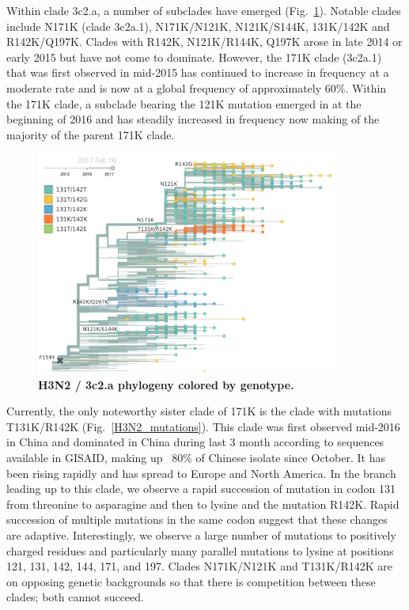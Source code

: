 \documentclass[11pt,oneside,letterpaper]{article}
\begin{document}
\pagebreak

Within clade 3c2.a, a number of subclades have emerged (Fig.\ \ref{H3N2_tree}).
Notable clades include N171K (clade 3c2a.1), N171K/N121K, N121K/S144K, 131K/142K and R142K/Q197K.
Clades with R142K, N121K/R144K, Q197K arose in late 2014 or early 2015 but have not come to dominate.
However, the 171K clade (3c2a.1) that was first observed in mid-2015 has continued to increase in frequency at a moderate rate and is now at a global frequency of approximately 60\%.
Within the 171K clade, a subclade bearing the 121K mutation emerged in at the beginning of 2016 and has steadily increased in frequency now making of the majority of the parent 171K clade.

\begin{figure}[H]
	\centering
	\includegraphics[width=0.9\textwidth]{../figures/feb-2017/h3n2_tree.png}
	\caption{\textbf{H3N2 / 3c2.a phylogeny colored by genotype.}
	}
	\label{H3N2_tree}
\end{figure}

Currently, the only noteworthy sister clade of 171K is the clade with mutations T131K/R142K (Fig.\ \ref{H3N2_mutations}).
This clade was first observed mid-2016 in China and dominated in China during last 3 month according to sequences available in GISAID, making up ~80\% of Chinese isolate since October.
It has been rising rapidly and has spread to Europe and North America.
In the branch leading up to this clade, we observe a rapid succession of mutation in codon 131 from threonine to asparagine and then to lysine and the mutation R142K.
Rapid succession of multiple mutations in the same codon suggest that these changes are adaptive.
Interestingly, we observe a large number of mutations to positively charged residues and particularly many parallel mutations to lysine at positions 121, 131, 142, 144, 171, and 197.
Clades N171K/N121K and T131K/R142K are on opposing genetic backgrounds so that there is competition between these clades; both cannot succeed.
\end{document}

